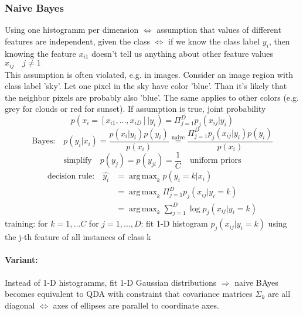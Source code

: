 \documentclass[11pt]{article}
\DeclareMathOperator*{\argmax}{arg\,max}
\begin{document}
\begin{itemize}
            \subsubsection{Naive Bayes}
              Using one histogramm per dimension $\iff$ assumption that values of different features are independent,
              given the class $\iff$ if we know the class label $y_i$, then knowing the feature $x_{i1}$ doesn't tell us anything about other feature values $x_{ij} \quad j\neq 1$ \\
              This assumption is often violated, e.g. in images. Consider an image region with class
              label 'sky'. Let one pixel in the sky have color 'blue'. Than it's likely that the neighbor pixels
              are probably also 'blue'. The same applies to other colors (e.g. grey for clouds or red for sunset).
              If assumption is true, joint probability
              \begin{equation*}
                p(x_i=[x_{i1},...,x_{iD}]|y_i) = \Pi_{j=1}^{D}p_j(x_{ij}|y_i)
              \end{equation*}
              \begin{equation*}
                \text{Bayes:} \quad p(y_i|x_i) = \frac{p(x_i|y_i)p(y_i)}{p(x_i)} \overset{\text{naive}}{=}
                \frac{\Pi_{j=1}^D p_j(x_{ij}|y_i)p(y_i)}{p(x_i)}
              \end{equation*}
              \begin{equation*}
                \text{simplify} \quad p(y_j) = p(y_{ji})=\frac{1}{C} \quad \text{uniform priors}
              \end{equation*}
              \begin{equation*}
                \begin{align*}
                  \text{decision rule:} \quad \hat{y_i} &= \argmax_k p(y_i=k|x_i) \\
                  &= \argmax_k \Pi_{j=1}^D p_j(x_{ij}|y_i=k) \\
                  &= \argmax_k \sum_{j=1}^D \log p_j(x_{ij}|y_i=k)
                \end{align*}
              \end{equation*}
              training: for $k=1,...C$ for $j=1,...,D$: fit 1-D histogram $p_j(x_{ij}|y_i=k)$ using the
              j-th feature of all instances of class k

              \paragraph{Variant:} Instead of 1-D histogramms, fit 1-D Gaussian distributions
              $\Rightarrow$ naive BAyes becomes equivalent to QDA with constraint that covariance matrices
              $\Sigma_k$ are all diagonal $\iff$ axes of ellipses are parallel to coordinate axes.

\end{itemize}
\end{document}
